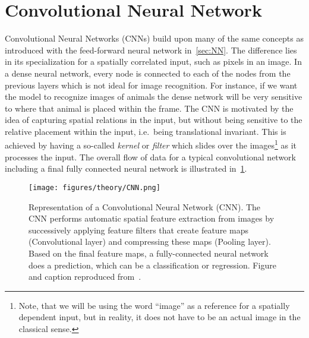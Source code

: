 \section{Convolutional Neural Network}\label{sec:CNN}
Convolutional Neural Networks (\acrshort{CNN}s) build upon many of the same
concepts as introduced with the feed-forward neural network in~\cref{sec:NN}.
The difference lies in its specialization for a spatially correlated input, such
as pixels in an image. In a dense neural network, every node is connected to
each of the nodes from the previous layers which is not ideal for image
recognition. For instance, if we want the model to recognize images of animals
the dense network will be very sensitive to where that animal is placed within
the frame. The \acrshort{CNN} is motivated by the idea of capturing spatial
relations in the input, but without being sensitive to the relative placement
within the input, i.e.\ being translational invariant. This is achieved by
having a so-called \textit{kernel} or \textit{filter} which slides over the
images\footnote{Note, that we will be using the word ``image'' as a reference
for a spatially dependent input, but in reality, it does not have to be an
actual image in the classical sense.} as it processes the input. The overall flow of data for a typical convolutional network including a final fully connected neural network is illustrated in~\cref{fig:CNN}. 


\begin{figure}[!htb]
  \centering
  \texttt{[image: figures/theory/CNN.png]}
  \caption{Representation of a Convolutional Neural Network (\acrshort{CNN}). The \acrshort{CNN} performs automatic spatial feature extraction from images by successively applying feature filters that create feature maps (Convolutional layer) and compressing these maps (Pooling layer). Based on the final feature maps, a fully-connected neural network does a prediction, which can be a classification or regression. Figure and caption reproduced from~\cite{cunha2022review}.}  
  \label{fig:CNN}
\end{figure}


